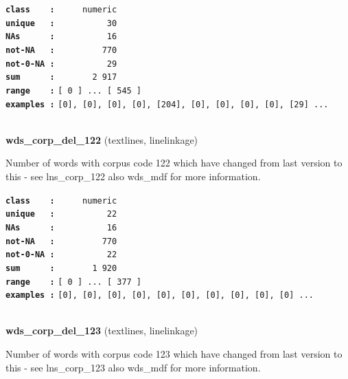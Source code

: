 \documentclass[]{article}
\begin{document}
\textbf{\texttt{class\ \ \ \ :}} \texttt{~~~~~numeric}\\
\textbf{\texttt{unique\ \ \ :}} \texttt{~~~~~~~~~~30}\\
\textbf{\texttt{NAs\ \ \ \ \ \ :}} \texttt{~~~~~~~~~~16}\\
\textbf{\texttt{not-NA\ \ \ :}} \texttt{~~~~~~~~~770}\\
\textbf{\texttt{not-0-NA\ :}} \texttt{~~~~~~~~~~29}\\
\textbf{\texttt{sum\ \ \ \ \ \ :}} \texttt{~~~~~~~2~917}\\
\textbf{\texttt{range\ \ \ \ :}}
\texttt{{[}\ 0\ {]}\ ...\ {[}\ 545\ {]}}\\
\textbf{\texttt{examples\ :}}
\texttt{{[}0{]},\ {[}0{]},\ {[}0{]},\ {[}0{]},\ {[}204{]},\ {[}0{]},\ {[}0{]},\ {[}0{]},\ {[}0{]},\ {[}29{]}\ ...}\\

~

\textbf{wds\_corp\_del\_122} (textlines, linelinkage)

Number of words with corpus code 122 which have changed from last
version to this - see lns\_corp\_122 also wds\_mdf for more information.

\textbf{\texttt{class\ \ \ \ :}} \texttt{~~~~~numeric}\\
\textbf{\texttt{unique\ \ \ :}} \texttt{~~~~~~~~~~22}\\
\textbf{\texttt{NAs\ \ \ \ \ \ :}} \texttt{~~~~~~~~~~16}\\
\textbf{\texttt{not-NA\ \ \ :}} \texttt{~~~~~~~~~770}\\
\textbf{\texttt{not-0-NA\ :}} \texttt{~~~~~~~~~~22}\\
\textbf{\texttt{sum\ \ \ \ \ \ :}} \texttt{~~~~~~~1~920}\\
\textbf{\texttt{range\ \ \ \ :}}
\texttt{{[}\ 0\ {]}\ ...\ {[}\ 377\ {]}}\\
\textbf{\texttt{examples\ :}}
\texttt{{[}0{]},\ {[}0{]},\ {[}0{]},\ {[}0{]},\ {[}0{]},\ {[}0{]},\ {[}0{]},\ {[}0{]},\ {[}0{]},\ {[}0{]}\ ...}\\

~

\textbf{wds\_corp\_del\_123} (textlines, linelinkage)

Number of words with corpus code 123 which have changed from last
version to this - see lns\_corp\_123 also wds\_mdf for more information.
\end{document}
